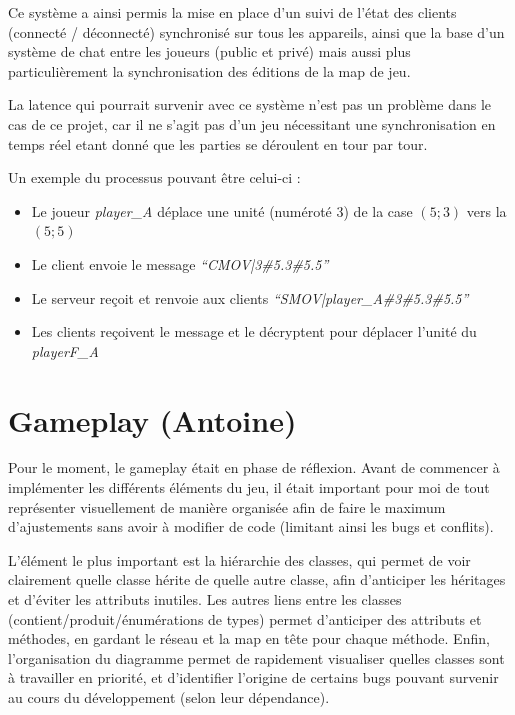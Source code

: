 \documentclass[12pt]{report}
\begin{document}
\vspace{1em}

Ce système a ainsi permis la mise en place d’un suivi de l’état des clients (connecté / déconnecté) synchronisé sur tous les appareils, ainsi que la base d’un système de chat entre les joueurs (public et privé) mais aussi plus particulièrement la synchronisation des éditions de la map de jeu.

La latence qui pourrait survenir avec ce système n’est pas un problème dans le cas de ce projet, car il ne s’agit pas d’un jeu nécessitant une synchronisation en temps réel etant donné que les parties se déroulent en tour par tour.

Un exemple du processus pouvant être celui-ci :

\begin{itemize}[label=\textbullet]
	\item Le joueur \textit{player\_A} déplace une unité (numéroté 3) de la case $(5;3)$ vers la $(5;5)$
	\item Le client envoie le message\textit{ “CMOV|3\#5.3\#5.5”}
	\item Le serveur reçoit et renvoie aux clients\textit{ “SMOV|player\_A\#3\#5.3\#5.5”}
	\item Les clients reçoivent le message et le décryptent pour déplacer l’unité du \textit{playerF\_A}
\end{itemize}

\section{Gameplay (Antoine)}

Pour le moment, le gameplay était en phase de réflexion. Avant de commencer à implémenter les différents éléments du jeu, il était important pour moi de tout représenter visuellement de manière organisée afin de faire le maximum d’ajustements sans avoir à modifier de code (limitant ainsi les bugs et conflits).

L’élément le plus important est la hiérarchie des classes, qui permet de voir clairement quelle classe hérite de quelle autre classe, afin d’anticiper les héritages et d’éviter les attributs inutiles. Les autres liens entre les classes (contient/produit/énumérations de types) permet d’anticiper des attributs et méthodes, en gardant le réseau et la map en tête pour chaque méthode. Enfin, l’organisation du diagramme permet de rapidement visualiser quelles classes sont à travailler en priorité, et d’identifier l’origine de certains bugs pouvant survenir au cours du développement (selon leur dépendance).
\end{document}
